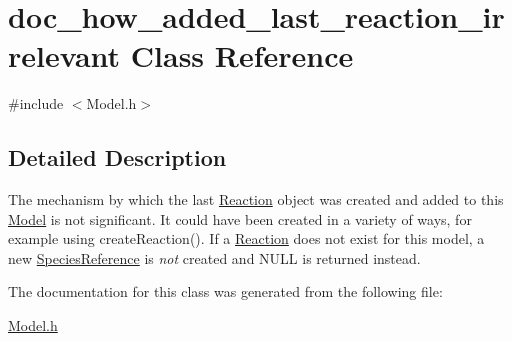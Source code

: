 \hypertarget{classdoc__how__added__last__reaction__irrelevant}{}\section{doc\+\_\+how\+\_\+added\+\_\+last\+\_\+reaction\+\_\+irrelevant Class Reference}
\label{classdoc__how__added__last__reaction__irrelevant}


{\ttfamily \#include $<$Model.\+h$>$}



\subsection{Detailed Description}
\begin{DoxyParagraph}{}
The mechanism by which the last \hyperlink{class_reaction}{Reaction} object was created and added to this \hyperlink{class_model}{Model} is not significant. It could have been created in a variety of ways, for example using create\+Reaction(). If a \hyperlink{class_reaction}{Reaction} does not exist for this model, a new \hyperlink{class_species_reference}{Species\+Reference} is {\itshape not} created and {\ttfamily N\+U\+LL} is returned instead. 
\end{DoxyParagraph}


The documentation for this class was generated from the following file\+:\begin{DoxyCompactItemize}
\item 
\hyperlink{_model_8h}{Model.\+h}\end{DoxyCompactItemize}
